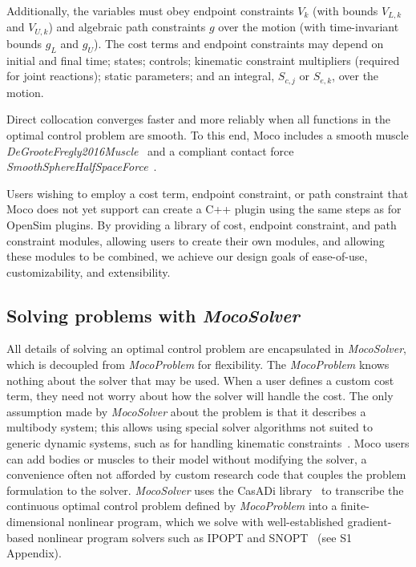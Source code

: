 \documentclass[10pt,letterpaper]{article}
\begin{document}
Additionally, the variables must obey endpoint constraints $V_k$ (with bounds $V_{L,k}$ and $V_{U,k}$) and algebraic path constraints $g$ over the motion (with time-invariant bounds $g_L$ and $g_U$). The cost terms and endpoint constraints may depend on initial and final time; states; controls; kinematic constraint multipliers (required for joint reactions); static parameters; and an integral, $S_{c,j}$ or $S_{e,k}$, over the motion.

Direct collocation converges faster and more reliably when all functions in the optimal control problem are smooth. To this end, Moco includes a smooth muscle \textit{DeGrooteFregly2016Muscle}~\cite{Groote:2016dq} and a compliant contact force \textit{SmoothSphereHalfSpaceForce}~\cite{Serrancoli:2019aa}.

Users wishing to employ a cost term, endpoint constraint, or path constraint that Moco does not yet support can create a C++ plugin using the same steps as for OpenSim plugins. By providing a library of cost, endpoint constraint, and path constraint modules, allowing users to create their own modules, and allowing these modules to be combined, we achieve our design goals of ease-of-use, customizability, and extensibility.


\subsection*{Solving problems with \textit{MocoSolver}}

All details of solving an optimal control problem are encapsulated in \textit{MocoSolver}, which is decoupled from \textit{MocoProblem} for flexibility. The \textit{MocoProblem} knows nothing about the solver that may be used. When a user defines a custom cost term, they need not worry about how the solver will handle the cost. The only assumption made by \textit{MocoSolver} about the problem is that it describes a multibody system; this allows using special solver algorithms not suited to generic dynamic systems, such as for handling kinematic constraints~\cite{Posa:2016}. Moco users can add bodies or muscles to their model without modifying the solver, a convenience often not afforded by custom research code that couples the problem formulation to the solver. \textit{MocoSolver} uses the CasADi library~\cite{Andersson:2019} to transcribe the continuous optimal control problem defined by \textit{MocoProblem} into a finite-dimensional nonlinear program, which we solve with well-established gradient-based nonlinear program solvers such as IPOPT and SNOPT~\cite{Wachter:2006,Gill:2005} (see S1 Appendix).
\end{document}
